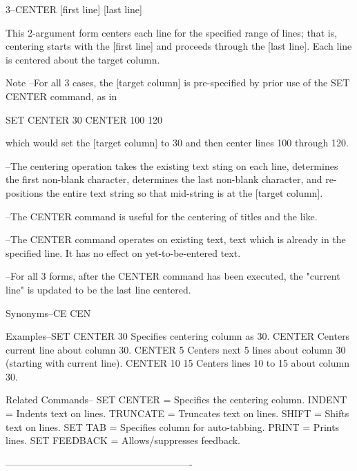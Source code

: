        3--CENTER   [first line]   [last line]
 
          This 2-argument form centers each line
          for the specified range of lines; that is,
          centering starts with the   [first line]
          and proceeds through the   [last line].
          Each line is centered about the target column.
 
Note    --For all 3 cases, the    [target column]
          is pre-specified by prior use of the
          SET CENTER command, as in
 
             SET CENTER 30
             CENTER 100 120
 
          which would set the [target column] to 30
          and then center lines 100 through 120.
 
        --The centering operation takes the existing
          text sting on each line, determines the first
          non-blank character, determines the last non-blank
          character, and re-positions the entire text string
          so that mid-string is at the    [target column].
 
        --The CENTER command is useful for the
          centering of titles and the like.
 
        --The CENTER command operates on existing text,
          text which is already in the specified line.
          It has no effect on yet-to-be-entered text.
 
        --For all 3 forms, after the CENTER command
          has been executed, the "current line" is
          updated to be the last line centered.
 
Synonyms--CE
          CEN
 
Examples--SET CENTER 30    Specifies centering column as 30.
          CENTER           Centers current line about column 30.
          CENTER 5         Centers next 5 lines about column 30
                           (starting with current line).
          CENTER 10 15     Centers lines 10 to 15 about column 30.
 
Related Commands--
          SET CENTER      = Specifies the centering column.
          INDENT          = Indents text on lines.
          TRUNCATE        = Truncates text on lines.
          SHIFT           = Shifts text on lines.
          SET TAB         = Specifies column for auto-tabbing.
          PRINT           = Prints lines.
          SET FEEDBACK    = Allows/suppresses feedback.
 
----------------------------------------------------------
 
